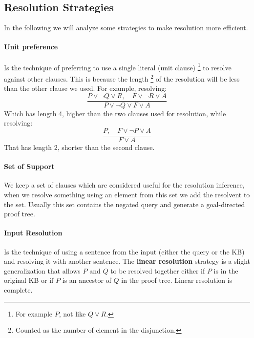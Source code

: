 \documentclass[10pt,a4paper]{article}
\begin{document}
\begin{itemize}
\subsection{Resolution Strategies}
In the following we will analyze some strategies to make resolution more efficient.

\paragraph{Unit preference} Is the technique of preferring to use a single literal (unit clause) \footnote{For example $P$, not like $Q\vee R$.} to resolve against other clauses. This is because the length \footnote{Counted as the number of element in the disjunction.} of the resolution will be less than the other clause we used. For example, resolving:
\[\frac{P\vee \neg Q \vee R,\quad  F \vee \neg R \vee A}{P\vee \neg Q\vee F \vee A}\]
Which has length 4, higher than the two clauses used for resolution, while resolving:
\[\frac{P,\quad  F \vee \neg P \vee A}{ F \vee A}\]
That has length 2, shorter than the second clause.

\paragraph{Set of Support} We keep a set of clauses which are considered useful for the resolution inference, when we resolve something using an element from this set we add the resolvent to the set. Usually this set contains the negated query and generate a goal-directed proof tree.


\paragraph{Input Resolution} Is the technique of using a sentence from the input (either the query or the KB) and resolving it with another sentence. The \textbf{linear resolution} strategy is a slight generalization that allows $P$ and $Q$ to be resolved together either if $P$ is in the original KB or if $P$ is an ancestor of $Q$ in the proof tree. Linear resolution is complete.











\newpage



\end{itemize}
\end{document}
